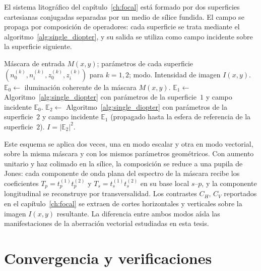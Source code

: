 El sistema litográfico del capítulo~\ref{ch:focal} está formado por dos
superficies cartesianas conjugadas separadas por un medio de sílice
fundida. El campo se propaga por composición de operadores: cada superficie
se trata mediante el algoritmo~\ref{alg:single_diopter}, y su salida se
utiliza como campo incidente sobre la superficie siguiente.

\begin{algorithm}[!htbp]
\caption{Sistema de dos superficies cartesianas conjugadas}
\label{alg:two_diopter}
\small
\begin{algorithmic}[1]
\Require Máscara de entrada $M(x,y)$; parámetros de cada superficie
$(n_0^{(k)},n_i^{(k)},z_0^{(k)},z_i^{(k)})$ para $k=1,2$; modo.
\Ensure Intensidad de imagen $I(x,y)$.
\State $\mathbb E_0\gets$ iluminación coherente de la máscara $M(x,y)$.
\State $\mathbb E_1\gets$ Algoritmo~\ref{alg:single_diopter} con parámetros
de la superficie~$1$ y campo incidente $\mathbb E_0$.
\State $\mathbb E_2\gets$ Algoritmo~\ref{alg:single_diopter} con parámetros
de la superficie~$2$ y campo incidente $\mathbb E_1$ (propagado hasta la
esfera de referencia de la superficie~$2$).
\State \Return $I=|\mathbb E_2|^2$.
\end{algorithmic}
\end{algorithm}

Este esquema se aplica dos veces, una en modo escalar y otra en modo
vectorial, sobre la misma máscara y con los mismos parámetros geométricos.
Con aumento unitario y haz colimado en la sílice, la composición se reduce a
una pupila de Jones: cada componente de onda plana del espectro de la máscara
recibe los coeficientes $T_p=t_p^{(1)}t_p^{(2)}$ y $T_s=t_s^{(1)}t_s^{(2)}$ en
su base local $s$--$p$, y la componente longitudinal se reconstruye por
transversalidad.
Los contrastes $C_H,\,C_V$ reportados en el capítulo~\ref{ch:focal} se
extraen de cortes horizontales y verticales sobre la imagen $I(x,y)$
resultante. La diferencia entre ambos modos aísla las manifestaciones de la
aberración vectorial estudiadas en esta tesis.

\section{Convergencia y verificaciones}

